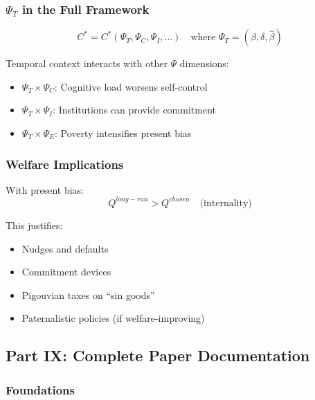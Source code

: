 \subsubsection{$\Psi_T$ in the Full Framework}

\begin{equation}
\boxed{
C^* = C^*(\Psi_T, \Psi_C, \Psi_I, \ldots) \quad \text{where } \Psi_T = (\beta, \delta, \hat{\beta})
}
\end{equation}

Temporal context interacts with other $\Psi$ dimensions:
\begin{itemize}
    \item $\Psi_T \times \Psi_C$: Cognitive load worsens self-control
    \item $\Psi_T \times \Psi_I$: Institutions can provide commitment
    \item $\Psi_T \times \Psi_E$: Poverty intensifies present bias
\end{itemize}

\subsubsection{Welfare Implications}

With present bias:
\begin{equation}
Q^{long-run} > Q^{chosen} \quad \text{(internality)}
\end{equation}

This justifies:
\begin{itemize}
    \item Nudges and defaults
    \item Commitment devices
    \item Pigouvian taxes on ``sin goods''
    \item Paternalistic policies (if welfare-improving)
\end{itemize}

\subsection{Part IX: Complete Paper Documentation}

\subsubsection{Foundations}

